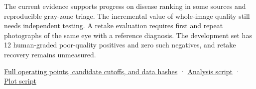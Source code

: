 \documentclass[
  10pt,
]{article}
\begin{document}
The current evidence supports progress on disease ranking in some
sources and reproducible gray-zone triage. The incremental value of
whole-image quality still needs independent testing. A retake evaluation
requires first and repeat photographs of the same eye with a reference
diagnosis. The development set has 12 human-graded poor-quality
positives and zero such negatives, and retake recovery remains
unmeasured.

\href{gray-zone-results.json}{Full operating points, candidate cutoffs,
and data hashes} ·
\href{../../../tools/audit_gray_zone_20261118.py}{Analysis script} ·
\href{../../../tools/plot_gray_zone_20261118.py}{Plot script}
\end{document}
